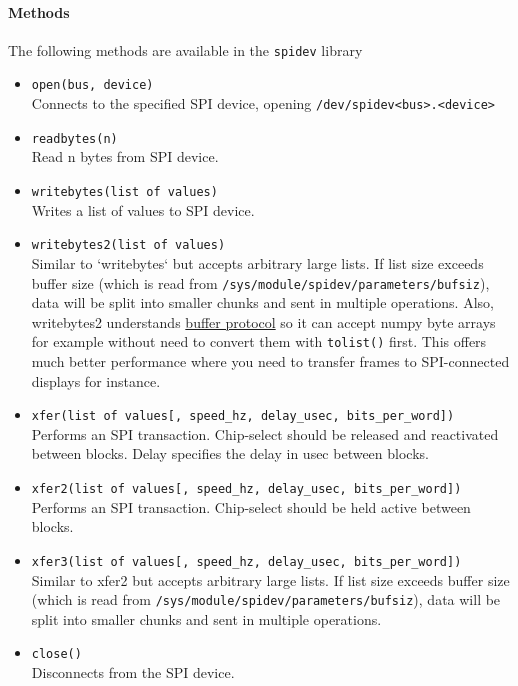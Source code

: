 \paragraph{Methods}
The following methods are available in the \verb|spidev| library
\begin{itemize}
    \item \verb|open(bus, device)|\\
    Connects to the specified SPI device, opening \verb|/dev/spidev<bus>.<device>|
    \item \verb|readbytes(n)|\\
    Read n bytes from SPI device.
    \item \verb|writebytes(list of values)|\\
    Writes a list of values to SPI device.
    \item \verb|writebytes2(list of values)|\\
    Similar to `writebytes` but accepts arbitrary large lists. If list size exceeds buffer size (which is read from \verb|/sys/module/spidev/parameters/bufsiz|), data will be split into smaller chunks and sent in multiple operations.
    Also, writebytes2 understands \href{https://docs.python.org/3/c-api/buffer.html}{buffer protocol} so it can accept numpy byte arrays for example without need to convert them with \verb|tolist()| first. This offers much better performance where you need to transfer frames to SPI-connected displays for instance.
    \item \verb|xfer(list of values[, speed_hz, delay_usec, bits_per_word])|\\
    Performs an SPI transaction. Chip-select should be released and reactivated between blocks. Delay specifies the delay in usec between blocks.
    \item \verb|xfer2(list of values[, speed_hz, delay_usec, bits_per_word])|\\
    Performs an SPI transaction. Chip-select should be held active between blocks.
    \item \verb|xfer3(list of values[, speed_hz, delay_usec, bits_per_word])|\\
    Similar to xfer2 but accepts arbitrary large lists. If list size exceeds buffer size (which is read from \verb|/sys/module/spidev/parameters/bufsiz|), data will be split into smaller chunks and sent in multiple operations.
    \item \verb|close()|\\
    Disconnects from the SPI device.
\end{itemize}

